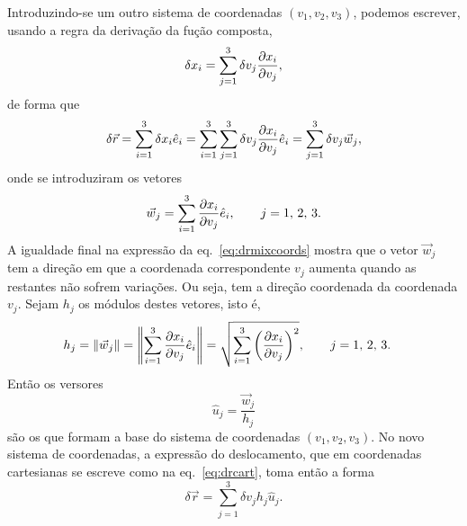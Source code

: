 Introduzindo-se um outro sistema de coordenadas $(v_1, v_2, v_3)$, podemos
escrever, usando a regra da derivação da fução composta,
\begin{equation*}
\delta x_i=\sum_{j=1}^3\delta v_j\frac{\partial x_i}{\partial v_j},
\end{equation*}
de forma que
\begin{equation}\label{eq:drmixcoords}
  \delta\vec r=\sum_{i=1}^3\delta x_i\he_i=\sum_{i=1}^3\sum_{j=1}^3\delta v_j
  \pd{x_i}{v_j}\he_i=\sum_{j=1}^3\delta v_j\vec w_j,
\end{equation}
onde se introduziram os vetores
\begin{equation*}
  \vec w_j=\sum_{i=1}^3\pd{x_i}{v_j}\he_i,\qquad j=1,\,2,\,3.
\end{equation*}
A igualdade final na expressão da eq.~\eqref{eq:drmixcoords} mostra que o vetor
$\vec w_j$ tem a direção em que a coordenada correspondente $v_j$ aumenta quando
as restantes não sofrem variações. Ou seja, tem a direção coordenada da
coordenada $v_j$. Sejam $h_j$ os módulos destes vetores, isto é,
\begin{align*}
  h_j&=\|\vec w_j\|=
  \left\|\sum_{i=1}^3\pd{x_i}{v_j}\he_i\right\|=
  \sqrt{\sum_{i=1}^3\left(\pd{x_i}{v_j}\right)^2},\qquad j=1,\,2,\,3.
\end{align*}
Então os versores
\begin{equation*}
  \hat u_j=\frac{\vec w_j}{h_j}
\end{equation*}
são os que formam a base do sistema de coordenadas $(v_1,v_2,v_3)$. No novo
sistema de coordenadas, a expressão do deslocamento, que em coordenadas
cartesianas se escreve como na eq.~\eqref{eq:drcart}, toma então a forma
\begin{equation}\label{eq:drncart}
  \delta\vec r = \sum_{j=1}^3\delta v_jh_j\hat u_j.
\end{equation}
\vspace{-5mm}
